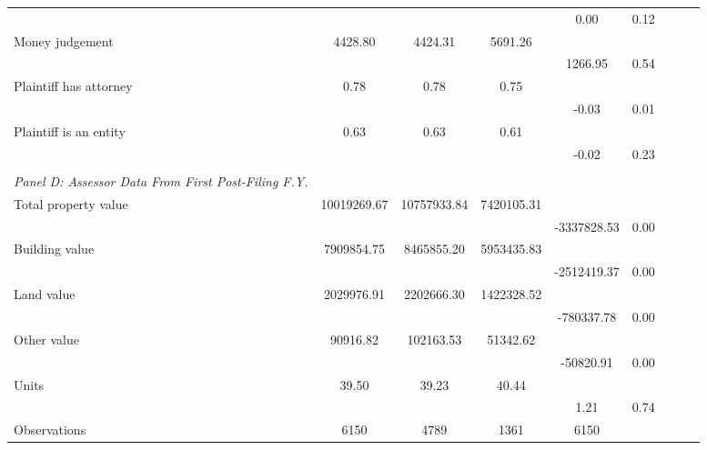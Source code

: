 \begin{table}[htbp]
\begin{tabular}{l*{4}{cc}}
                    &            &            &            &        0.00&        0.12\\
\hspace{0.25cm}Money judgement&     4428.80&     4424.31&     5691.26&            &            \\
                    &            &            &            &     1266.95&        0.54\\
\hspace{0.25cm}Plaintiff has attorney&        0.78&        0.78&        0.75&            &            \\
                    &            &            &            &       -0.03&        0.01\\
\hspace{0.25cm}Plaintiff is an entity&        0.63&        0.63&        0.61&            &            \\
                    &            &            &            &       -0.02&        0.23\\
\vspace{0.1em} \\ \emph{Panel D: Assessor Data From First Post-Filing F.Y.}&            &            &            &            &            \\
\hspace{0.25cm}Total property value& 10019269.67& 10757933.84&  7420105.31&            &            \\
                    &            &            &            & -3337828.53&        0.00\\
\hspace{0.25cm}Building value&  7909854.75&  8465855.20&  5953435.83&            &            \\
                    &            &            &            & -2512419.37&        0.00\\
\hspace{0.25cm}Land value&  2029976.91&  2202666.30&  1422328.52&            &            \\
                    &            &            &            &  -780337.78&        0.00\\
\hspace{0.25cm}Other value&    90916.82&   102163.53&    51342.62&            &            \\
                    &            &            &            &   -50820.91&        0.00\\
\hspace{0.25cm}Units&       39.50&       39.23&       40.44&            &            \\
                    &            &            &            &        1.21&        0.74\\
\midrule
Observations        &        6150&        4789&        1361&        6150&            \\
\bottomrule
\end{tabular}
\end{table}
